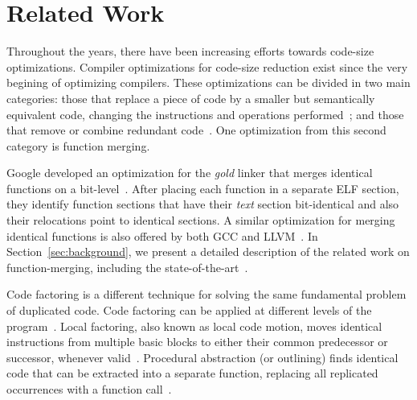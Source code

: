 \vspace{-2ex}
\section{Related Work}

Throughout the years, there have been increasing efforts towards code-size
optimizations.
Compiler optimizations for code-size reduction exist since the very begining
of optimizing compilers.
These optimizations can be divided in two main categories:
those that replace a piece of code by a smaller but semantically equivalent code,
changing the instructions and operations performed~\cite{massalin87,tanenbaum82};
and those that remove or combine redundant code~\cite{cocke70,knoop94,ernst97,
                                              cooper99,debray00,chen03,loki04}.
One optimization from this second category is function
merging.

Google developed an optimization for the \textit{gold} linker that merges
identical functions on a bit-level~\cite{tallam10,kwan12}.
After placing each function in a separate ELF section, they identify function
sections that have their \textit{text} section bit-identical and also their
relocations point to identical sections.
A similar optimization for merging identical functions %
is also offered by both GCC and LLVM~\cite{llvm-fm,livska14}.
In Section~\ref{sec:background}, we present a detailed description of the
related work on function-merging, including the state-of-the-art~\cite{edler14}.



Code factoring is a different technique for solving the same fundamental problem
of duplicated code.
Code factoring can be applied at different levels of the program~\cite{loki04}.
Local factoring, also known as local code motion, moves identical instructions
from multiple basic blocks to either their common predecessor or successor,
whenever valid~\cite{knoop94,briggs94,loki04}.
Procedural abstraction (or outlining) finds identical code
that can be extracted into a separate function, replacing all replicated
occurrences with a function call~\cite{loki04,dreweke07}.


